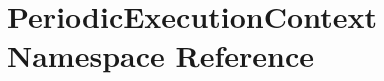 \section{Periodic\-Execution\-Context Namespace Reference}
\label{namespacePeriodicExecutionContext}


